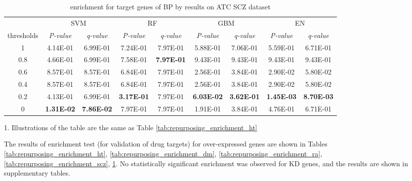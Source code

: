         \begin{table}[htbp]
          \centering
          \caption{enrichment for target genes of BP by results on ATC SCZ dataset}
          \begin{threeparttable}
            \tabcolsep=0.10cm
            \begin{tabular}{ccccccccc}
            \toprule
                  & \multicolumn{2}{c}{SVM}  & \multicolumn{2}{c}{RF} & \multicolumn{2}{c}{GBM} & \multicolumn{2}{c}{EN} \\
            thresholds & \textit{P-value} & \textit{q-value} & \textit{P-value} & \textit{q-value} & \textit{P-value} & \textit{q-value} & \textit{P-value} & \textit{q-value} \\
            \midrule
            1     & 4.14E-01 & 6.99E-01 & 7.24E-01 & 7.97E-01 & 5.88E-01 & 7.06E-01 & 5.59E-01 & 6.71E-01 \\
            0.8   & 4.66E-01 & 6.99E-01 & 7.58E-01 & \textbf{7.97E-01} & 9.43E-01 & 9.43E-01 & 9.43E-01 & 9.43E-01 \\
            0.6   & 8.57E-01 & 8.57E-01 & 6.84E-01 & 7.97E-01 & 2.56E-01 & 3.84E-01 & 2.90E-02 & 5.80E-02 \\
            0.4   & 8.57E-01 & 8.57E-01 & 6.84E-01 & 7.97E-01 & 2.56E-01 & 3.84E-01 & 2.90E-02 & 5.80E-02 \\
            0.2   & 4.13E-01 & 6.99E-01 & \textbf{3.17E-01} & 7.97E-01 & \textbf{6.03E-02} & \textbf{3.62E-01} & \textbf{1.45E-03} & \textbf{8.70E-03} \\
            0     & \textbf{1.31E-02} & \textbf{7.86E-02} & 7.97E-01 & 7.97E-01 & 1.91E-01 & 3.84E-01 & 4.76E-01 & 6.71E-01 \\
            \midrule
            \end{tabular}%
            \begin{tablenotes}
              \item 1. Illustrations of the table are the same as Table \ref{tab:repurposing_enrichment_ht}
            \end{tablenotes}
          \end{threeparttable}
          \label{tab:repurposing_enrichment_bp}%
        \end{table}%

    The results of enrichment test (for validation of drug targets) for over-expressed genes are shown in Tables \ref{tab:repurposing_enrichment_ht}, \ref{tab:repurposing_enrichment_dm}, \ref{tab:repurposing_enrichment_ra}, \ref{tab:repurposing_enrichment_scz}, \ref{tab:repurposing_enrichment_bp}. No statistically significant enrichment was observed for KD genes, and the results are shown in supplementary tables. 
    
